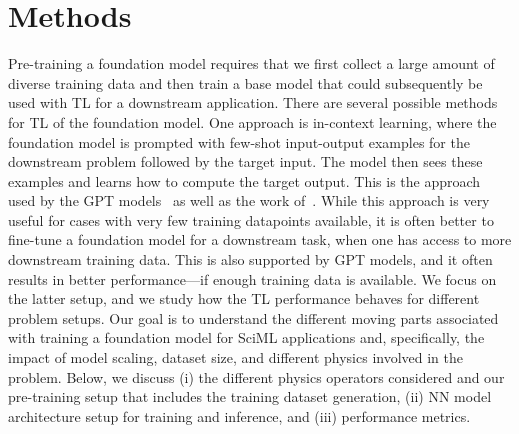 
\section{Methods}
\label{sec:methods}
Pre-training a foundation model requires that we first collect a large amount of diverse training
data and then train a base model that could subsequently be used with TL for a downstream  application. 
There are several possible methods for TL of the foundation model.
One approach is in-context learning, where the foundation model is prompted with
few-shot input-output examples for the downstream problem followed by the target input.
The model then sees these examples and learns how to compute the target output.
This is the approach used by the GPT models~\cite{radford2018improving,radford2019language,brown2020language} as well as the work of~\cite{yang2023context}.
While this approach is very useful for cases with very few training datapoints available, it is often better to fine-tune a foundation model for a downstream task, when one has access to more downstream training data. 
This is also supported by GPT models, and it often results in better performance---if enough training data is available.
We focus on the latter setup, and we study how the TL performance behaves for different problem setups.
Our goal is to understand the different moving parts associated with training a foundation model for SciML applications and, specifically, the impact of model scaling, dataset size, and different physics involved in the problem. 
Below, we discuss (i) the different physics operators considered and our pre-training setup that includes the training dataset generation, (ii) NN model architecture setup for training and inference, and (iii) performance metrics.


